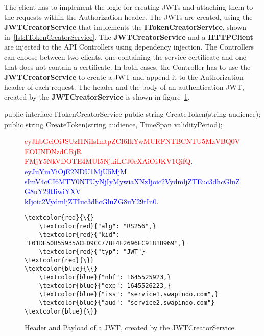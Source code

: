 The client has to implement the logic for creating JWTs and attaching them to the requests within the Authorization header.
The JWTs are created, using the \textbf{JWTCreatorService} that implements the \textbf{ITokenCreatorService}, shown in~\ref{lst:ITokenCreatorService}.
The \textbf{JWTCreatorService} and a \textbf{HTTPClient} are injected to the API Controllers using dependency injection.
The Controllers can choose between two clients, one containing the service certificate and one that does not contain a certificate.
In both cases, the Controller has to use the \textbf{JWTCreatorService} to create a JWT and append it to the Authorization header of each request.
The header and the body of an authentication JWT, created by the \textbf{JWTCreatorService} is shown in figure~\ref{fig:jwt_en_decoded}.

\noindent \begin{minipage}{\linewidth}
	\begin{CsCode}[label={lst:ITokenCreatorService}, caption={ITokenCreatorService interface, that is injected to the API Controllers},captionpos=b]
		public interface ITokenCreatorService {
			public string CreateToken(string audience);
			public string CreateToken(string audience, TimeSpan validityPeriod);
		}
	\end{CsCode}
\end{minipage}

\begin{figure}
	\begin{centering}
	\end{centering}
	\textcolor{red}{eyJhbGciOiJSUzI1NiIsImtpZCI6IkYwMURFNTBCNTU5MzVBQ0VEOUNDNzdCRjR\\FMjY5NkVDOTE4MUI5NjkiLCJ0eXAiOiJKV1QifQ}.
	\textcolor{blue}{eyJuYmYiOjE2NDU1MjU5MjM\\sImV4cCI6MTY0NTUyNjIyMywiaXNzIjoic2VydmljZTEuc3dhcGluZG8uY29tIiwiYXV\\kIjoic2VydmljZTIuc3dhcGluZG8uY29tIn0}.
	\\ 
	\begin{Verbatim}[commandchars=\\\{\}]
\textcolor{red}{\{} 
	\textcolor{red}{"alg": "RS256",}
	\textcolor{red}{"kid": "F01DE50B55935ACED9CC77BF4E2696EC9181B969",}
	\textcolor{red}{"typ": "JWT"} 
\textcolor{red}{\}}
\textcolor{blue}{\{} 
	\textcolor{blue}{"nbf": 1645525923,}
	\textcolor{blue}{"exp": 1645526223,}
	\textcolor{blue}{"iss": "service1.swapindo.com",}
	\textcolor{blue}{"aud": "service2.swapindo.com"} 
\textcolor{blue}{\}}
	\end{Verbatim}
	\caption{Header and Payload of a JWT, created by the JWTCreatorService}
	\label{fig:jwt_en_decoded}
\end{figure}

